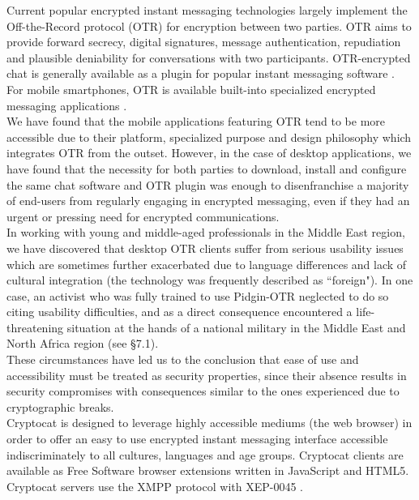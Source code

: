 \documentclass[letterpaper,twocolumn,10pt]{article}
\begin{document}
Current popular encrypted instant messaging technologies largely implement the Off-the-Record protocol (OTR) \cite{otr} for encryption between two parties. OTR aims to provide forward secrecy, digital signatures, message authentication, repudiation and plausible deniability for conversations with two participants. OTR-encrypted chat is generally available as a plugin for popular instant messaging software \cite{otr-pidgin,otr-adium,otr-jitsi,otr-gajim}. For mobile smartphones, OTR is available built-into specialized encrypted messaging applications \cite{gibberbot,chatsecure}. \\
We have found that the mobile applications featuring OTR tend to be more accessible due to their platform, specialized purpose and design philosophy which integrates OTR from the outset. However, in the case of desktop applications, we have found that the necessity for both parties to download, install and configure the same chat software and OTR plugin was enough to disenfranchise a majority of end-users from regularly engaging in encrypted messaging, even if they had an urgent or pressing need for encrypted communications. \\
In working with young and middle-aged professionals in the Middle East region, we have discovered that desktop OTR clients suffer from serious usability issues which are sometimes further exacerbated due to language differences and lack of cultural integration (the technology was frequently described as ``foreign"). In one case, an activist who was fully trained to use Pidgin-OTR \cite{otr-pidgin} neglected to do so citing usability difficulties, and as a direct consequence encountered a life-threatening situation at the hands of a national military in the Middle East and North Africa region (see \S7.1). \\
These circumstances have led us to the conclusion that ease of use and accessibility must be treated as security properties, since their absence results in security compromises with consequences similar to the ones experienced due to cryptographic breaks. \\
Cryptocat is designed to leverage highly accessible mediums (the web browser) in order to offer an easy to use encrypted instant messaging interface accessible indiscriminately to all cultures, languages and age groups. Cryptocat clients are available as Free Software browser extensions \cite{cryptocat} written in JavaScript and HTML5. Cryptocat servers use the XMPP protocol \cite{xmpp} with XEP-0045 \cite{xep-0045}.
\end{document}
